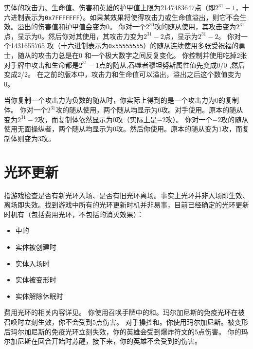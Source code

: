 实体的攻击力、生命值、伤害和英雄的护甲值上限为2147483647点（即$2^{31}-1$，十六进制表示为\texttt{0x7FFFFFFF}）。如果某效果将使得攻击力或生命值溢出，则它不会生效。溢出的伤害值和护甲值会变为0。
\example 你对一个$2^{30}$攻的随从使用，其攻击变为$2^{31}$点，显示为0。然后你对其使用，其攻击力变为$2^{31}-2$点，显示为$2^{31}-2$。
\example 你对一个1431655765 攻（十六进制表示为\texttt{0x55555555}）的随从连续使用多张受祝福的勇士，随从的攻击力总是在0 和一个极大数字之间反复变化。
\example 你控制并使用吃掉2张对手牌中攻击和生命都是$2^{31}-1$点的随从,吞噬者穆坦努斯属性值先变成0/0 ,然后变成2/2。
\history {} 在之前的版本中，攻击力和生命值可以溢出，溢出之后这个数值变为0。

当你复制一个攻击力为负数的随从时，你实际上得到的是一个攻击力为0的复制体。
\example {} 你对一个$2^{31}$攻的随从使用，两个随从均显示为0攻。对手使用。原本的随从变为$2^{31}-2$攻，而复制体依然显示为0攻（实际上是$-2$攻）。
\example {} 你对一个$-2$攻的随从使用无面操纵者，两个随从均显示为0攻。然后你使用。原本的随从变为1攻，而复制体则变为3攻。

\section{光环更新}
\label{aura-update}

指游戏检查是否有新光环入场、是否有旧光环离场。事实上光环并非入场即生效、离场即失效。找到游戏中所有的光环更新时机并非易事，目前已经确定的光环更新时机有（包括费用光环，不包括的消灭效果）：
\begin{itemize}
    \item {}中的
    \item 实体被创建时
    \item 实体入场时
    \item 实体被变形时
    \item 实体解除休眠时
\end{itemize}

\notice 费用光环的相关内容详见。
\example 你使用召唤手牌中的和。玛尔加尼斯的免疫光环在被召唤时立刻生效，你不会受到5点伤害。
\example 对手操控和。你使用玛尔加尼斯。被变形后玛尔加尼斯的免疫光环立刻失效，你的英雄会受到爆炸符文的5点伤害。
\example 你的玛尔加尼斯在回合开始时苏醒，接下来，你的英雄不会受到的伤害。

